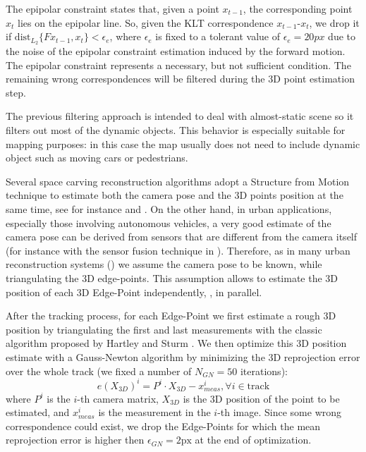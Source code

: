 The epipolar constraint states that, given a point $x_{t-1}$, the corresponding point $x_{t}$ lies on the epipolar line. So, given the KLT correspondence $x_{t-1}$-${x}_{t}$, we drop it if $\text{dist}_{L_2}\{Fx_{t-1}, {x}_{t}\} <\epsilon_e$, where $\epsilon_e$ is fixed to a tolerant value of $\epsilon_e = 20px$ due to the noise of the epipolar constraint estimation induced by the forward motion.
The epipolar constraint represents a necessary, but not sufficient condition. The remaining wrong correspondences will be filtered during the 3D point estimation step.

The previous filtering approach is intended to deal with almost-static scene so it filters out most of  the dynamic objects. This behavior is especially suitable for mapping purposes: in this case the map usually does not need to include dynamic object such as moving cars or pedestrians. 


Several space carving reconstruction algorithms adopt a Structure from Motion technique to estimate both  the camera pose and the 3D points position at the same time, see for instance \cite{Yu_Lhuillier12, litvinov_lhuillier_13} and \cite{lovi_et_al_11}. 
On the other hand, in urban applications, especially those involving autonomous vehicles, a very good estimate of the camera pose can be derived from sensors that are different from the camera itself (for instance with the sensor fusion technique in \cite{Cucci_Matteucci14}). 
Therefore, as in  many urban reconstruction systems (\cite{ pollefeys_et_al_08,cornelis_et_al08})  we assume the camera pose to be known, while triangulating the 3D edge-points. This assumption allows to estimate the 3D position of each 3D Edge-Point independently, \ie, in parallel.

After the tracking process, for each Edge-Point we first estimate a rough 3D position by triangulating the first and last measurements with the classic algorithm proposed by Hartley and Sturm \cite{Hartley_Sturm97}. 
We then optimize this 3D position estimate with a Gauss-Newton algorithm by minimizing the 3D reprojection error over the whole track (we fixed a number of $N_{GN} = 50$ iterations):
\begin{equation}
 e(X_{3D})^i = P^i \cdot X_{3D} - x_{meas}^i, \forall i \in \text{track}
\end{equation}
where $P^i$ is the $i$-th camera matrix, $X_{3D}$ is the 3D position of the point to be estimated, and $x_{meas}^i$ is the  measurement in the $i$-th image.
Since some wrong correspondence could exist, we drop the Edge-Points for which the mean reprojection error is higher then $\epsilon_{GN} = 2\text{px}$ at the end of optimization.





